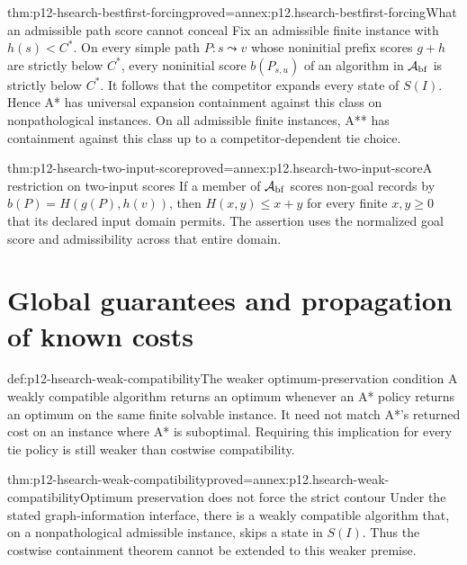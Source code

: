 \begin{hbtheorem}{thm:p12-hsearch-bestfirst-forcing}{proved=annex:p12.hsearch-bestfirst-forcing}{What an admissible path score cannot conceal}
Fix an admissible finite instance with \(h(s)<C^*\). On every simple path
\(P:s\leadsto v\) whose noninitial prefix scores \(g+h\) are
strictly below \(C^*\), every noninitial score \(b(P_{s,u})\) of
an algorithm in \(\mathcal A_{\rm bf}\) is strictly below \(C^*\).
It follows that the competitor expands every state of \(S(I)\).
Hence A* has universal expansion containment against this class on
nonpathological instances. On all admissible finite instances, A** has
containment against this class up to a competitor-dependent tie choice.
\end{hbtheorem}

\begin{hbtheorem}{thm:p12-hsearch-two-input-score}{proved=annex:p12.hsearch-two-input-score}{A restriction on two-input scores}
If a member of \(\mathcal A_{\rm bf}\) scores non-goal records by
\(b(P)=H(g(P),h(v))\), then
\(H(x,y)\le x+y\) for every finite \(x,y\ge 0\) that its
declared input domain permits. The assertion uses the normalized goal
score and admissibility across that entire domain.
\end{hbtheorem}

\section{Global guarantees and propagation of known costs}
\label{sec:p12-hsearch-cost-closure}

\begin{hbdefinition}{def:p12-hsearch-weak-compatibility}{The weaker optimum-preservation condition}
A weakly compatible algorithm returns an optimum whenever an A* policy
returns an optimum on the same finite solvable instance. It need not
match A*'s returned cost on an instance where A* is suboptimal.
Requiring this implication for every tie policy is still weaker than
costwise compatibility.
\end{hbdefinition}

\begin{hbtheorem}{thm:p12-hsearch-weak-compatibility}{proved=annex:p12.hsearch-weak-compatibility}{Optimum preservation does not force the strict contour}
Under the stated graph-information interface, there is a weakly
compatible algorithm that, on a nonpathological admissible instance,
skips a state in \(S(I)\). Thus the costwise containment theorem
cannot be extended to this weaker premise.
\end{hbtheorem}

